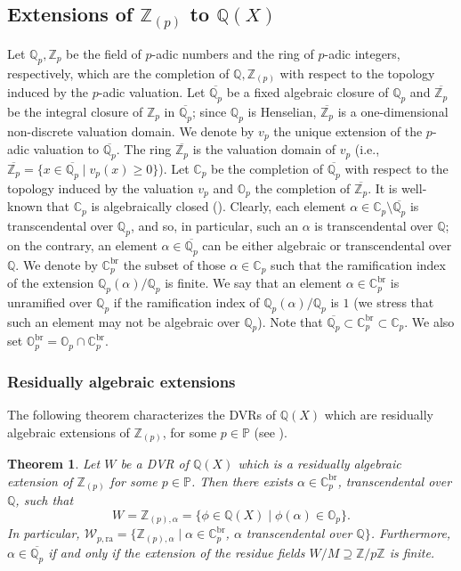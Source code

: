 \documentclass[10pt]{article}
\numberwithin{equation}{section}
\newtheorem{Thm}[equation]{Theorem}
\theoremstyle{definition}
\theoremstyle{definition}
\newcommand{\Q}{\mathbb{Q}}
\newcommand{\Z}{\mathbb{Z}}
\newcommand{\C}{\mathbb{C}}
\renewcommand{\O}{\mathbb{O}}
\newcommand{\PP}{\mathbb{P}}
\newcommand{\oQp}{\overline{\Q_p}}
\newcommand{\ra}{\text{ra}}
\newcommand{\oZp}{\overline{\Z_p}}
\newcommand{\br}{\text{br}}
\begin{document}
\subsection{Extensions of $\Z_{(p)}$ to $\Q(X)$}



Let $\Q_p,\Z_p$ be the field of $p$-adic numbers and the ring of $p$-adic integers, respectively, which are the completion of $\Q,\Z_{(p)}$ with respect to the topology induced by the $p$-adic valuation. Let $\oQp$ be a fixed algebraic closure of $\Q_p$ and $\oZp$ be the integral closure of $\Z_p$ in $\oQp$; since $\Q_p$ is Henselian, $\oZp$ is a one-dimensional non-discrete valuation domain. We denote by $v_p$ the unique extension of the $p$-adic valuation to $\oQp$. The ring $\oZp$ is the valuation domain of $v_p$ (i.e., $\oZp=\{x\in\oQp\mid v_p(x)\geq0\}$). Let $\C_p$ be the completion of $\oQp$ with respect to the topology induced by the valuation $v_p$ and $\O_p$ the completion of $\oZp$. It is well-known that $\C_p$ is algebraically closed (\cite[Proposition 5.7.8]{g97}).
Clearly, each element $\alpha\in\C_p\setminus\oQp$ is transcendental over $\Q_p$, and so, in particular, such an $\alpha$ is transcendental over $\Q$; on the contrary, an element  $\alpha\in\oQp$ can be either algebraic or transcendental over $\Q$. We denote by $\C_p^{\br}$ the subset of those $\alpha\in\C_p$ such that the ramification index of the extension $\Q_p(\alpha)/\Q_p$ is finite. We say that an element $\alpha\in\C_p^{\br}$ is unramified over $\Q_p$ if the ramification index of $\Q_p(\alpha)/\Q_p$ is $1$ (we stress that such an element may not be algebraic over $\Q_p$). Note that $\oQp\subset\C_p^{\br}\subset\C_p$. We also set $\O_p^{\br}=\O_p\cap\C_p^{\br}$.


\subsubsection{Residually algebraic extensions}


The following theorem characterizes the DVRs of $\Q(X)$ which are residually algebraic extensions of $\Z_{(p)}$, for some $p\in\PP$ (see \cite[Corollary 2.28]{PerStacked}).

\begin{Thm}\label{DVR ra}
Let $W$ be a DVR of $\Q(X)$ which is a residually algebraic extension of $\Z_{(p)}$ for some $p\in\PP$. 
Then there exists $\alpha\in\C_p^{\br}$, transcendental over $\Q$, such that
\begin{equation}\label{Zpalpha}
W=\Z_{(p),\alpha}=\{\phi\in\Q(X)\mid \phi(\alpha)\in \mathbb O_p\}.
\end{equation}
In particular, $\mathcal{W}_{p,\ra} = \{\Z_{(p), \alpha} \mid \alpha\in\C_p^{\br}$, $\alpha$ transcendental over $\Q\}$.
Furthermore,  $\alpha \in \oQp$ if and only if the extension of the residue fields $W/M\supseteq\Z/p\Z$ is finite.
\end{Thm}
\end{document}
